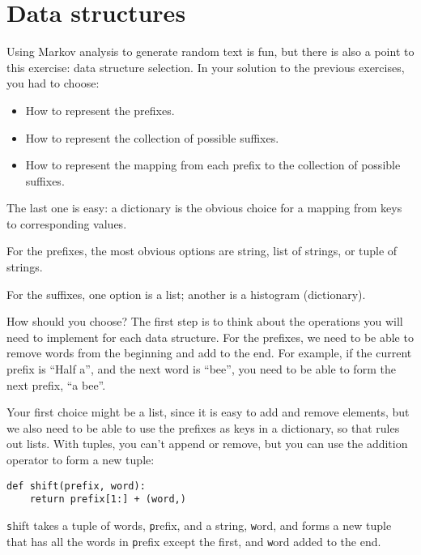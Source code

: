 \documentclass[
DIV=11,
fontsize=13,
twoside,
headinclude=false,
titlepage=firstiscover,
abstract=true,
headsepline=true,
footsepline=true,
chapterprefix=true, %
headings=big,
bibliography=totoc,%
captions=tableheading
]{scrbook}
\theoremstyle{definition}
\begin{document}
\section{Data structures}

Using Markov analysis to generate random text is fun, but there is
also a point to this exercise: data structure selection.  In your
solution to the previous exercises, you had to choose:

\begin{itemize}

\item How to represent the prefixes.

\item How to represent the collection of possible suffixes.

\item How to represent the mapping from each prefix to
the collection of possible suffixes.

\end{itemize}

The last one is easy: a dictionary is the obvious choice
for a mapping from keys to corresponding values.

For the prefixes, the most obvious options are string,
list of strings, or tuple of strings.

For the suffixes,
one option is a list; another is a histogram (dictionary).

How should you choose?  The first step is to think about
the operations you will need to implement for each data structure.
For the prefixes, we need to be able to remove words from
the beginning and add to the end.  For example, if the current
prefix is ``Half a'', and the next word is ``bee'', you need
to be able to form the next prefix, ``a bee''.

Your first choice might be a list, since it is easy to add
and remove elements, but we also need to be able to use the
prefixes as keys in a dictionary, so that rules out lists.
With tuples, you can't append or remove, but you can use
the addition operator to form a new tuple:

\begin{lstlisting}
def shift(prefix, word):
    return prefix[1:] + (word,)
\end{lstlisting}
%
{\texttt shift} takes a tuple of words, {\texttt prefix}, and a string, 
{\texttt word}, and forms a new tuple that has all the words
in {\texttt prefix} except the first, and {\texttt word} added to
the end.
\end{document}
